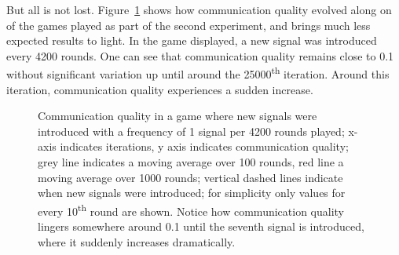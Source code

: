 \documentclass[
	DIV=calc,
	BCOR=0mm,
	pagesize,
]{scrartcl}
\begin{document}
But all is not lost.
Figure~\ref{fig:com} shows how communication quality evolved along on of the games played as part of the second experiment, and brings much less expected results to light.
In the game displayed, a new signal was introduced every 4200 rounds.
One can see that communication quality remains close to 0.1 without significant variation up until around the 25000\textsuperscript{th} iteration.
Around this iteration, communication quality experiences a sudden increase.

\begin{figure}
	\centering
	\caption{Communication quality in a game where new signals were introduced with a frequency of 1 signal per 4200 rounds played; x-axis indicates iterations, y axis indicates communication quality; grey line indicates a moving average over 100 rounds, red line a moving average over 1000 rounds; vertical dashed lines indicate when new signals were introduced; for simplicity only values for every 10\textsuperscript{th} round are shown. Notice how communication quality lingers somewhere around 0.1 until the seventh signal is introduced, where it suddenly increases dramatically.}
	\label{fig:com}
\end{figure}
\end{document}
